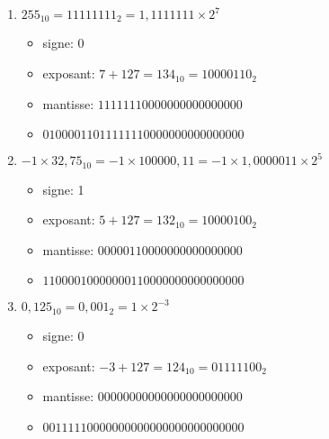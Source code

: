 \documentclass[a4paper,11pt]{article}
\begin{document}
\begin{Form}
\begin{exo}
\begin{enumerate}
\item $255_{10}=11111111_2=1,1111111×2^7$
\begin{itemize}
\item signe: 0
\item exposant: $7+127=134_{10}=10000110_2$
\item mantisse: $11111110000000000000000$
\item $0 10000110 11111110000000000000000$
\end{itemize}
\item $-1×32,75_{10}=-1×100000,11=-1×1,0000011×2^5$
\begin{itemize}
\item signe: 1
\item exposant: $5+127=132_{10}=10000100_2$
\item mantisse: $00000110000000000000000$
\item $1 10000100 00000110000000000000000$
\end{itemize}
\item $0,125_{10}=0,001_2=1×2^{-3}$
\begin{itemize}
\item signe: 0
\item exposant: $-3+127=124_{10}=01111100_2$
\item mantisse: $00000000000000000000000$
\item $0 01111100 00000000000000000000000$
\end{itemize}
\end{enumerate}
\end{exo}
\end{Form}
\end{document}
